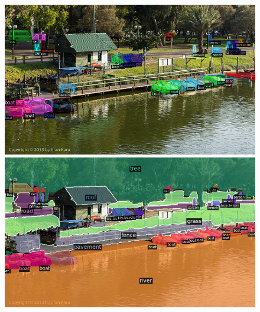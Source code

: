 \begin{figure}[h!]
\begin{minipage}[b]{.45\linewidth}
    \end{minipage}
    
    \begin{minipage}[b]{.45\linewidth}
    \includegraphics[width=\linewidth]{vis/success/val_707_det.png}
    \end{minipage}
    \begin{minipage}[b]{.45\linewidth}
    \includegraphics[width=\linewidth]{vis/success/val_707_pan.png}
    \end{minipage}
    

\end{figure}
